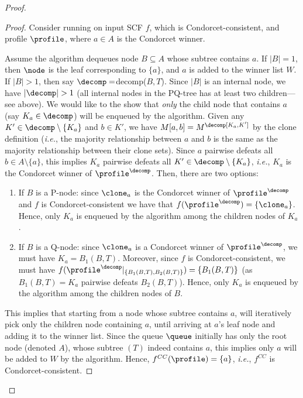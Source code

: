 \begin{proof}
\begin{proof}
Consider running  on input SCF $f$, which is Condorcet-consistent, and profile $\profile$, where $a \in A$ is the Condorcet winner.


Assume the algorithm dequeues node $B \subseteq A$ whose subtree contains $a$. If $|B|=1$, then $\node$ is the leaf corresponding to $\{a\}$, and $a$ is added to the winner list $W$. If $|B|>1$, then say $\decomp =$decomp($B,T$). Since $|B|$ is an internal node, we have $|\decomp|>1$ (all internal nodes in the PQ-tree has at least two children---see  above). We would like to the show that \emph{only} the child node that contains $a$ (say $K_a \in \decomp$) will be enqueued by the algorithm. Given any $K' \in \decomp \setminus\{K_a\}$ and $b \in K'$, we have $M[a,b] =M^\decomp[K_a,K']$ by the clone definition (\emph{i.e.}, the majority relationship between $a$ and $b$ is the same as the majority relationship between their clone sets). Since $a$ pairwise defeats all $b \in A \setminus\{a\}$, this implies $K_a$ pairwise defeats all $K' \in \decomp \setminus\{K_a\}$, \emph{i.e.}, $K_a$ is the Condorcet winner of $\profile^\decomp$. Then, there are two options:

\begin{enumerate}
    \item If $B$ is a P-node: since $\clone_a$ is the Condorcet winner of $\profile^\decomp$ and $f$ is Condorcet-consistent we have that $f(\profile^\decomp) = \{\clone_a\}$. Hence, only $K_a$ is enqueued by the algorithm among the children nodes of $K_a$.
    \item If $B$ is a Q-node: since $\clone_a$ is a Condorcet winner of $\profile^\decomp$, we must have $K_a= B_1(B,T)$. Moreover, since $f$ is Condorcet-consistent, we must have $f(\profile^\decomp|_{\{B_1(B,T),B_2(B,T)\}})=\{B_1(B,T)\}$ (as $B_1(B,T)=K_a$ pairwise defeats $B_2(B,T)$). Hence, only $K_a$ is enqueued by the algorithm among the children nodes of $B$.
\end{enumerate}

This implies that starting from a node whose subtree contains $a$,  will iteratively pick only the children node containing $a$, until arriving at $a$'s leaf node and adding it to the winner list. Since the queue $\queue$ initially has only the root node (denoted $A$), whose subtree $(T)$ indeed contains $a$, this implies only $a$ will be added to $W$ by the algorithm. Hence, $f^{CC}(\profile) = \{a\}$, \emph{i.e.}, $f^{CC}$ is Condorcet-consistent. 
\end{proof} 



\end{proof}
